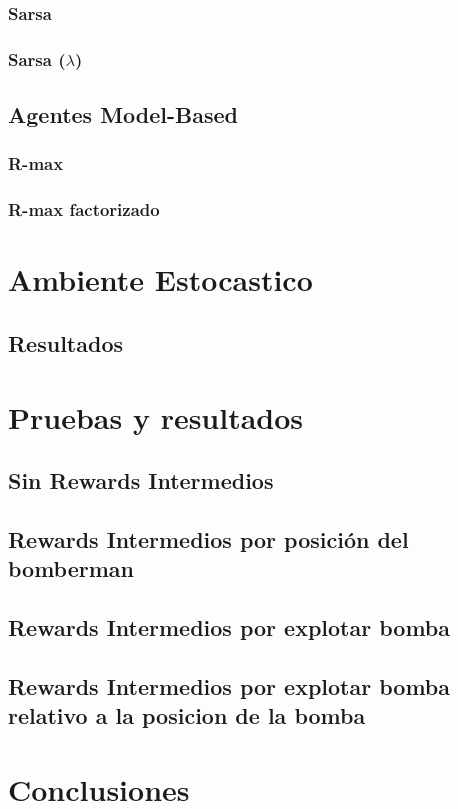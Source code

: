 \documentclass[a4paper,spanish] {article}
\begin{document}
		\subsubsection{Sarsa}
		\subsubsection{Sarsa ($\lambda$)}	
	\subsection{Agentes Model-Based}	
		\subsubsection{R-max}
		\subsubsection{R-max factorizado}

\section{Ambiente Estocastico}
	\subsection{Resultados}
	



\section{Pruebas y resultados}
	\subsection{Sin Rewards Intermedios}
	\subsection{Rewards Intermedios por posición del bomberman}
	\subsection{Rewards Intermedios por explotar bomba}
	\subsection{Rewards Intermedios por explotar bomba relativo a la posicion de la bomba}

\section{Conclusiones}


	





		


		
		

		
		
		
		
\newpage
\tableofcontents
\newpage
	 
	
\end{document}
